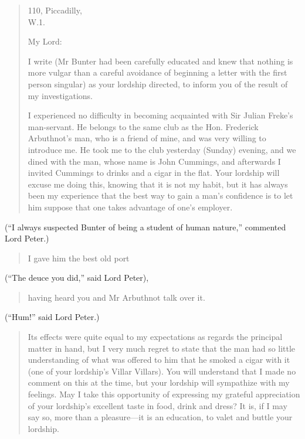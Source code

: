 \begin{quotation}
\begin{flushright}
110, Piccadilly,\\
W.1.
\end{flushright}

\noindent My Lord:

I write (Mr Bunter had been carefully educated and knew that nothing is more vulgar than a careful avoidance of beginning a letter with the first person singular) as your lordship directed, to inform you of the result of my investigations.

I experienced no difficulty in becoming acquainted with Sir Julian Freke’s man-servant. He belongs to the same club as the Hon. Frederick Arbuthnot’s man, who is a friend of mine, and was very willing to introduce me. He took me to the club yesterday (Sunday) evening, and we dined with the man, whose name is John Cummings, and afterwards I invited Cummings to drinks and a cigar in the flat. Your lordship will excuse me doing this, knowing that it is not my habit, but it has always been my experience that the best way to gain a man’s confidence is to let him suppose that one takes advantage of one’s employer.
\end{quotation}

(\enquote{I always suspected Bunter of being a student of human nature,} commented Lord Peter.)

\begin{quotation}
I gave him the best old port 
\end{quotation}

(\enquote{The deuce you did,} said Lord Peter), 

\begin{quotation}
having heard you and Mr Arbuthnot talk over it.
\end{quotation}

 (\enquote{Hum!} said Lord Peter.)

\begin{quotation}
Its effects were quite equal to my expectations as regards the principal matter in hand, but I very much regret to state that the man had so little understanding of what was offered to him that he smoked a cigar with it (one of your lordship’s Villar Villars). You will understand that I made no comment on this at the time, but your lordship will sympathize with my feelings. May I take this opportunity of expressing my grateful appreciation of your lordship’s excellent taste in food, drink and dress? It is, if I may say so, more than a pleasure\allowbreak---\allowbreak it is an education, to valet and buttle your lordship.
\end{quotation}

